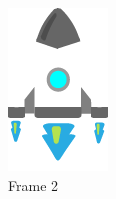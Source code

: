 \begin{figure}[!htb]
  \includegraphics[width=\linewidth]{chapters/modding/shipDetails_2.png}
  \caption*{Frame 2}
\endminipage\hfill
{}%

\end{figure}
